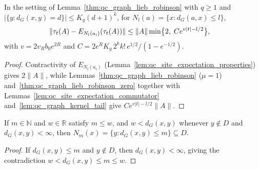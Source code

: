 \begin{lemma}
    \label{thm:qc_graph_ball_localization}
    \leanok
    In the setting of Lemma~\ref{thm:qc_graph_lieb_robinson} with $q\geq1$ and $|\{y:d_G(x,y)=d\}|\le K_g(d+1)^k$, for $N_l(a)=\{x:d_G(a,x)\leq l\}$,
    \begin{align}
        \|\tau_t(A)-E_{N_l(a_i)}(\tau_t(A))\|
         & \leq\|A\|\min\bigl\{2,\;Ce^{v|t|-l/2}\bigr\},\notag
    \end{align}
    with $v=2v_Rb_0e^{2R}$ and $C=2e^RK_g\,2^kk!\,e^{1/2}/(1-e^{-1/2})$.
\end{lemma}
\begin{proof}\leanok
    Contractivity of $E_{N_l(a_i)}$ (Lemma~\ref{lem:qc_site_expectation_properties}) gives $2\|A\|$, while Lemmas~\ref{thm:qc_graph_lieb_robinson} ($\mu=1$) and~\ref{thm:qc_graph_lieb_robinson_zero} together with Lemmas~\ref{lem:qc_site_expectation_commutator} and~\ref{lem:qc_graph_kernel_tail} give $Ce^{v|t|-l/2}\|A\|$.
\end{proof}

\begin{lemma}
    \label{lem:qc_graph_ball_strict_margin}
    \leanok
    If $m\in\mathbb N$ and $w\in\mathbb R$ satisfy $m\le w$, and $w<d_G(x,y)$ whenever $y\notin D$ and $d_G(x,y)<\infty$, then $N_m(x)=\{y:d_G(x,y)\le m\}\subseteq D$.
\end{lemma}
\begin{proof}\leanok
    If $d_G(x,y)\le m$ and $y\notin D$, then $d_G(x,y)<\infty$, giving the contradiction $w<d_G(x,y)\le m\le w$.
\end{proof}

